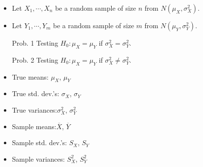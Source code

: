 \begin{frame}
\begin{itemize}
	\item Let $X_1,\cdots, X_n$ be a random sample of size $n$ from $N(\mu_X,\sigma^2_X)$.	\\[1em]
	\item Let $Y_1,\cdots, Y_m$ be a random sample of size $m$ from $N(\mu_Y,\sigma^2_Y)$.
\end{itemize}
\vfill
\begin{center}
\begin{minipage}{0.5\textwidth}
\begin{enumerate}
	\item[Prob. 1] Testing $H_0:\mu_X=\mu_Y$ if $\sigma_X^2 = \sigma_Y^2$. \\[3em]
	\item[Prob. 2] Testing $H_0:\mu_X=\mu_Y$ if $\sigma_X^2 \ne \sigma_Y^2$.
\end{enumerate}
\end{minipage}
\end{center}
\vfill
\mySeparateLine
\vfill

\begin{minipage}{0.4\textwidth}
	\begin{itemize}
		\item True means: \hfill $\mu_X$, $\mu_Y$
		\item True std. dev.'s: \hfill $\sigma_X$, $\sigma_Y$
		\item True variances:\hfill  $\sigma_X^2$, $\sigma_Y^2$\\[2em]
	\end{itemize}
\end{minipage}
\hfill
\begin{minipage}{0.45\textwidth}
	\begin{itemize}
		\item Sample means:\hfill  $\overline{X}$, $\overline{Y}$
		\item Sample std. dev.'s: \hfill $S_X$, $S_Y$
		\item Sample variances: \hfill $S_X^2$, $S_Y^2$
	\end{itemize}
\end{minipage}
\end{frame}
